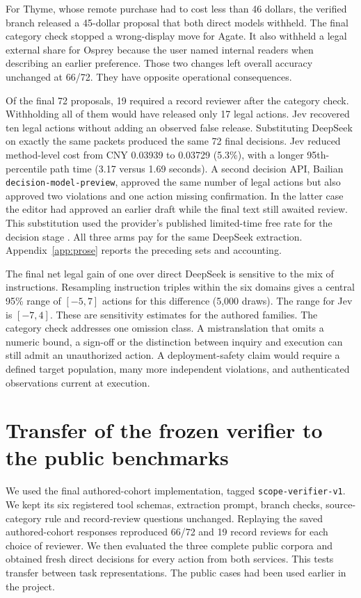For Thyme, whose remote purchase had to cost less than 46 dollars, the verified branch released a 45-dollar proposal that both direct models withheld. The final category check stopped a wrong-display move for Agate. It also withheld a legal external share for Osprey because the user named internal readers when describing an earlier preference. Those two changes left overall accuracy unchanged at 66/72. They have opposite operational consequences.

Of the final 72 proposals, 19 required a record reviewer after the category check. Withholding all of them would have released only 17 legal actions. Jev recovered ten legal actions without adding an observed false release. Substituting DeepSeek on exactly the same packets produced the same 72 final decisions. Jev reduced method-level cost from CNY 0.03939 to 0.03729 (5.3\%), with a longer 95th-percentile path time (3.17 versus 1.69 seconds). A second decision API, Bailian \texttt{decision-model-preview}, approved the same number of legal actions but also approved two violations and one action missing confirmation. In the latter case the editor had approved an earlier draft while the final text still awaited review. This substitution used the provider's published limited-time free rate for the decision stage \cite{bailianprice}. All three arms pay for the same DeepSeek extraction. Appendix~\ref{app:prose} reports the preceding sets and accounting.

The final net legal gain of one over direct DeepSeek is sensitive to the mix of instructions. Resampling instruction triples within the six domains gives a central 95\% range of $[-5,7]$ actions for this difference (5,000 draws). The range for Jev is $[-7,4]$. These are sensitivity estimates for the authored families. The category check addresses one omission class. A mistranslation that omits a numeric bound, a sign-off or the distinction between inquiry and execution can still admit an unauthorized action. A deployment-safety claim would require a defined target population, many more independent violations, and authenticated observations current at execution.
\FloatBarrier

\section{Transfer of the frozen verifier to the public benchmarks}\label{sec:public-transfer}
We used the final authored-cohort implementation, tagged \texttt{scope-verifier-v1}. We kept its six registered tool schemas, extraction prompt, branch checks, source-category rule and record-review questions unchanged. Replaying the saved authored-cohort responses reproduced 66/72 and 19 record reviews for each choice of reviewer. We then evaluated the three complete public corpora and obtained fresh direct decisions for every action from both services. This tests transfer between task representations. The public cases had been used earlier in the project.

